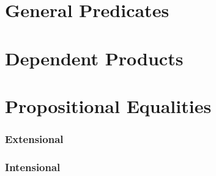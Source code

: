 
\appendix
\newpage
\section{General Predicates}

\newpage
\section{Dependent Products}

\newpage
\section{Propositional Equalities}
\subsubsection*{Extensional}

\subsubsection*{Intensional}


